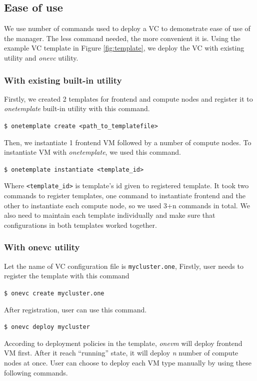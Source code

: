 \documentclass[conference]{IEEEtran}
\begin{document}
\subsection{Ease of use}
We use number of commands used to deploy a VC to demonstrate ease of use of the manager.
The less command needed, the more convenient it is.
Using the example VC template in Figure \ref{fig:template}, we deploy the VC with existing utility and \emph{onevc} utility.

\subsubsection{With existing built-in utility}
Firstly, we created 2 templates for frontend and compute nodes and register it to \emph{onetemplate} built-in utility with this command.

\texttt{\$ onetemplate create <path\_to\_templatefile>}

Then, we instantiate 1 frontend VM followed by a number of compute nodes.
To instantiate VM with \emph{onetemplate}, we used this command.

\texttt{\$ onetemplate instantiate <template\_id>}

Where \texttt{<template\_id>} is template's id given to registered template.
It took two commands to register templates, one command to instantiate frontend and the other to instantiate each compute node, so we used 3+n commands in total.
We also need to maintain each template individually and make sure that configurations in both templates worked together.

\subsubsection{With onevc utility}

Let the name of VC configuration file is \texttt{mycluster.one}, Firstly, user needs to register the template with this command

\texttt{\$ onevc create mycluster.one}

After registration, user can use this command.

\texttt{\$ onevc deploy mycluster}

According to deployment policies in the template, \emph{onevm} will deploy frontend VM first.
After it reach ``running'' state, it will deploy \emph{n} number of compute nodes at once.
User can choose to deploy each VM type manually by using these following commands. 
\end{document}
